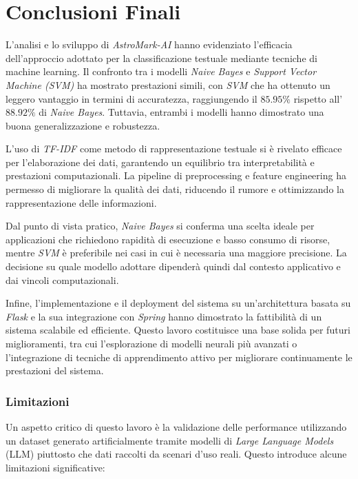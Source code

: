 \chapter{Conclusioni Finali}
L'analisi e lo sviluppo di \textit{AstroMark-AI} hanno evidenziato l'efficacia dell'approccio adottato per la classificazione testuale mediante tecniche di machine learning. Il confronto tra i modelli \textit{Naive Bayes} e \textit{Support Vector Machine (SVM)} ha mostrato prestazioni simili, con \textit{SVM} che ha ottenuto un leggero vantaggio in termini di accuratezza, raggiungendo il $85.95\%$ rispetto all'$88.92\%$ di \textit{Naive Bayes}. Tuttavia, entrambi i modelli hanno dimostrato una buona generalizzazione e robustezza.

L'uso di \textit{TF-IDF} come metodo di rappresentazione testuale si è rivelato efficace per l'elaborazione dei dati, garantendo un equilibrio tra interpretabilità e prestazioni computazionali. La pipeline di preprocessing e feature engineering ha permesso di migliorare la qualità dei dati, riducendo il rumore e ottimizzando la rappresentazione delle informazioni.

Dal punto di vista pratico, \textit{Naive Bayes} si conferma una scelta ideale per applicazioni che richiedono rapidità di esecuzione e basso consumo di risorse, mentre \textit{SVM} è preferibile nei casi in cui è necessaria una maggiore precisione. La decisione su quale modello adottare dipenderà quindi dal contesto applicativo e dai vincoli computazionali.

Infine, l'implementazione e il deployment del sistema su un'architettura basata su \textit{Flask} e la sua integrazione con \textit{Spring} hanno dimostrato la fattibilità di un sistema scalabile ed efficiente. Questo lavoro costituisce una base solida per futuri miglioramenti, tra cui l'esplorazione di modelli neurali più avanzati o l'integrazione di tecniche di apprendimento attivo per migliorare continuamente le prestazioni del sistema.

\subsection{Limitazioni}
Un aspetto critico di questo lavoro è la validazione delle performance utilizzando un dataset generato artificialmente tramite modelli di \textit{Large Language Models} (LLM) piuttosto che dati raccolti da scenari d’uso reali. Questo introduce alcune limitazioni significative:

